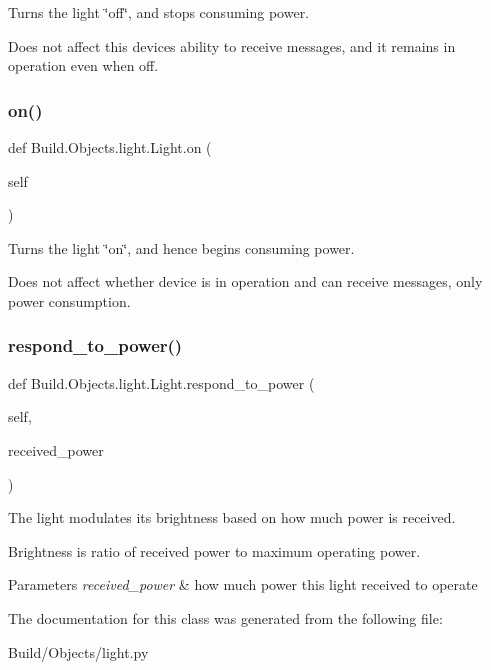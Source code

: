 Turns the light \char`\"{}off\char`\"{}, and stops consuming power. 

Does not affect this device\textquotesingle{}s ability to receive messages, and it remains in operation even when off. \mbox{\label{class_build_1_1_objects_1_1light_1_1_light_a12a3c2afe2f8f97aa1d5e28da9059c4e}} 
\subsubsection{\texorpdfstring{on()}{on()}}
{\footnotesize\ttfamily def Build.\+Objects.\+light.\+Light.\+on (\begin{DoxyParamCaption}\item[{}]{self }\end{DoxyParamCaption})}



Turns the light \char`\"{}on\char`\"{}, and hence begins consuming power. 

Does not affect whether device is in operation and can receive messages, only power consumption. \mbox{\label{class_build_1_1_objects_1_1light_1_1_light_aabf8b9ee88178489130e5e612d22f7d0}} 
\subsubsection{\texorpdfstring{respond\+\_\+to\+\_\+power()}{respond\_to\_power()}}
{\footnotesize\ttfamily def Build.\+Objects.\+light.\+Light.\+respond\+\_\+to\+\_\+power (\begin{DoxyParamCaption}\item[{}]{self,  }\item[{}]{received\+\_\+power }\end{DoxyParamCaption})}



The light modulates its brightness based on how much power is received. 

Brightness is ratio of received power to maximum operating power. 
\begin{DoxyParams}{Parameters}
{\em received\+\_\+power} & how much power this light received to operate \\
\hline
\end{DoxyParams}


The documentation for this class was generated from the following file\+:\begin{DoxyCompactItemize}
\item 
Build/\+Objects/light.\+py\end{DoxyCompactItemize}
